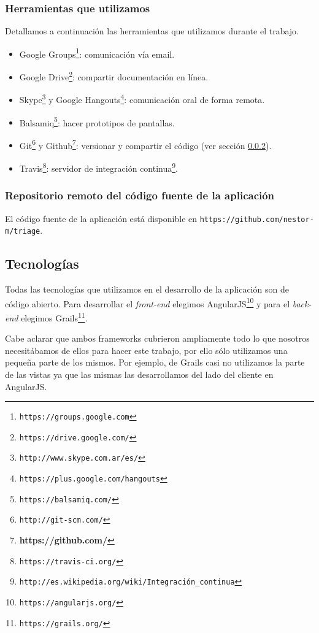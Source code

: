 \subsubsection{Herramientas que utilizamos}
Detallamos a continuación las herramientas que utilizamos durante el trabajo.
\begin{itemize}
\item Google Groups\footnote{\texttt{https://groups.google.com}}: comunicación vía email.
\item Google Drive\footnote{\texttt{https://drive.google.com/}}: compartir documentación en línea.
\item Skype\footnote{\texttt{http://www.skype.com.ar/es/}} y Google Hangouts\footnote{\texttt{https://plus.google.com/hangouts}}: comunicación oral de forma remota.
\item Balsamiq\footnote{\texttt{https://balsamiq.com/}}: hacer prototipos de pantallas.
\item Git\footnote{\texttt{http://git-scm.com/}} y Github\footnote{\textbf{https://github.com/}}: versionar y compartir el código (ver sección \ref{cap:repo}).
\item Travis\footnote{\texttt{https://travis-ci.org/}}: servidor de integración continua\footnote{\texttt{http://es.wikipedia.org/wiki/Integración\_continua}}.
\end{itemize}

\subsubsection{Repositorio remoto del código fuente de la aplicación}\label{cap:repo}
El código fuente de la aplicación está disponible en \texttt{https://github.com/nestor-m/triage}.

\subsection{Tecnologías}
Todas las tecnologías que utilizamos en el desarrollo de la aplicación son de código abierto. Para desarrollar el \textit{front-end} elegimos AngularJS\footnote{\texttt{https://angularjs.org/}} y para el \textit{back-end} elegimos Grails\footnote{\texttt{https://grails.org/}}.

Cabe aclarar que ambos frameworks cubrieron ampliamente todo lo que nosotros necesitábamos de ellos para hacer este trabajo, por ello sólo utilizamos una pequeña parte de los mismos. Por ejemplo, de Grails casi no utilizamos la parte de las vistas ya que las mismas las desarrollamos del lado del cliente en AngularJS.

